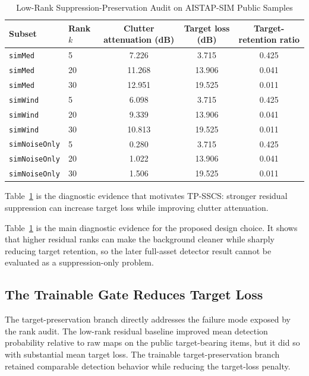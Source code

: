 \documentclass[journal]{IEEEtran}
\begin{document}
\begin{table}[!t]
\caption{Low-Rank Suppression-Preservation Audit on AISTAP-SIM Public Samples}
\label{tab:lowrank-preservation-audit}
\centering
\footnotesize
\renewcommand{\arraystretch}{1.12}
\begin{tabular}{@{}llccc@{}}
\toprule
Subset & Rank $k$ & Clutter attenuation (dB) & Target loss (dB) & Target-retention ratio \\
\midrule
\texttt{simMed} & 5  & 7.226  & 3.715  & 0.425 \\
\texttt{simMed} & 20 & 11.268 & 13.906 & 0.041 \\
\texttt{simMed} & 30 & 12.951 & 19.525 & 0.011 \\
\texttt{simWind} & 5  & 6.098  & 3.715  & 0.425 \\
\texttt{simWind} & 20 & 9.339  & 13.906 & 0.041 \\
\texttt{simWind} & 30 & 10.813 & 19.525 & 0.011 \\
\texttt{simNoiseOnly} & 5  & 0.280 & 3.715  & 0.425 \\
\texttt{simNoiseOnly} & 20 & 1.022 & 13.906 & 0.041 \\
\texttt{simNoiseOnly} & 30 & 1.506 & 19.525 & 0.011 \\
\bottomrule
\end{tabular}
\vspace{0.35em}
\parbox{0.94\textwidth}{\scriptsize Table~\ref{tab:lowrank-preservation-audit} is the diagnostic evidence that motivates TP-SSCS: stronger residual suppression can increase target loss while improving clutter attenuation.}
\end{table}

Table~\ref{tab:lowrank-preservation-audit} is the main diagnostic evidence for the proposed design choice. It shows that higher residual ranks can make the background cleaner while sharply reducing target retention, so the later full-asset detector result cannot be evaluated as a suppression-only problem.

\subsection{The Trainable Gate Reduces Target Loss}

The target-preservation branch directly addresses the failure mode exposed by the rank audit. The low-rank residual baseline improved mean detection probability relative to raw maps on the public target-bearing items, but it did so with substantial mean target loss. The trainable target-preservation branch retained comparable detection behavior while reducing the target-loss penalty.
\end{document}
